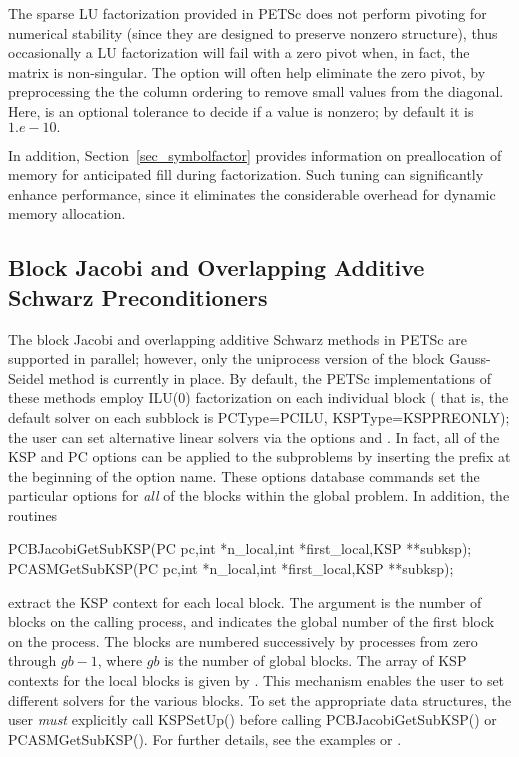 The sparse LU factorization provided in PETSc does not perform pivoting for
numerical stability (since they are designed to preserve nonzero
structure), thus occasionally a LU factorization will fail with a zero
pivot when, in fact, the matrix is non-singular. The option
 
will often help eliminate the zero pivot, by preprocessing the the
column ordering to remove small values from the diagonal. Here, 
is an optional tolerance to decide if a value is nonzero; by default it
is~$ 1.e-10.$


In addition, Section~\ref{sec_symbolfactor} provides information on
preallocation of memory for anticipated fill during factorization.
Such tuning can significantly enhance performance, since it
eliminates the considerable overhead for dynamic memory allocation.

\subsection{Block Jacobi and
            Overlapping Additive Schwarz Preconditioners}
\label{sec_bjacobi}

 
  
The block Jacobi and overlapping additive Schwarz methods in PETSc are
supported in parallel; however, only the uniprocess
version of the block Gauss-Seidel method is currently in place.
By default, the PETSc implementations of these methods
employ ILU(0) factorization on each individual block ( that is, the default solver on each
subblock is PCType=PCILU, KSPType=KSPPREONLY); the user can set alternative linear solvers via the options
 
 and . In fact, all of the KSP
and PC options can be applied to the subproblems by inserting the prefix
 at the beginning of the option name. 
These options database commands set the particular options for {\em all}
of the blocks within the global problem.  In addition, the routines
\begin{tabbing}
  PCBJacobiGetSubKSP(PC pc,int *n\_local,int *first\_local,KSP **subksp);\\
  PCASMGetSubKSP(PC pc,int *n\_local,int *first\_local,KSP **subksp);
\end{tabbing}
extract the KSP context for each local
block.  The argument  is the number of blocks on the
calling process, and  indicates the global number
of the first block on the process. The blocks are numbered
successively by processes from zero through $ gb-1$,
where $ gb $ is the number of global blocks.
The array of KSP contexts for the local blocks is given by .
This mechanism enables the user to set different solvers for the
various blocks.  To set the appropriate data structures, the
user {\em must} explicitly call KSPSetUp()
before calling PCBJacobiGetSubKSP() or
PCASMGetSubKSP().
For further details, see the
examples  or .

